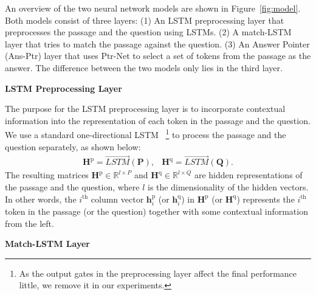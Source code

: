 \documentclass{article} \usepackage{iclr2017_conference,times}
\begin{document}
An overview of the two neural network models are shown in Figure~\ref{fig:model}.
Both models consist of three layers:
(1) An LSTM preprocessing layer that preprocesses the passage and the question using LSTMs.
(2) A match-LSTM layer that tries to match the passage against the question.
(3) An Answer Pointer (Ans-Ptr) layer that uses Ptr-Net to select a set of tokens from the passage as the answer.
The difference between the two models only lies in the third layer.

\noindent \textbf{LSTM Preprocessing Layer}

The purpose for the LSTM preprocessing layer is to incorporate contextual information into the representation of each token in the passage and the question.
We use a standard one-directional LSTM~\citep{hochreiter1997long} \footnote{As the output gates in the preprocessing layer affect the final performance little, we remove it in our experiments.} to process the passage and the question separately, as shown below:
\begin{equation}
\begin{matrix}
\mathbf{H}^{\text{p}} = \overrightarrow{\textit{LSTM}} (\mathbf{P}), & \mathbf{H}^{\text{q}} =\overrightarrow{\textit{LSTM}} (\mathbf{Q}).
\end{matrix}
\end{equation}
The resulting matrices $\mathbf{H}^{\text{p}} \in \mathbb{R}^{l \times P}$ and $\mathbf{H}^{\text{q}} \in \mathbb{R}^{l \times Q}$ are hidden representations of the passage and the question, where $l$ is the dimensionality of the hidden vectors.
In other words, the $i^{\text{th}}$ column vector $\mathbf{h}^{\text{p}}_i$ (or $\mathbf{h}^{\text{q}}_i$) in $\mathbf{H}^{\text{p}}$ (or $\mathbf{H}^{\text{q}}$) represents the $i^{\text{th}}$ token in the passage (or the question) together with some contextual information from the left.

\noindent \textbf{Match-LSTM Layer}
\end{document}
